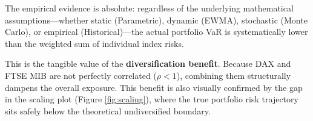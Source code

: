 \documentclass{report}
\begin{document}
The empirical evidence is absolute: regardless of the underlying mathematical assumptions—whether static (Parametric), dynamic (EWMA), stochastic (Monte Carlo), or empirical (Historical)—the actual portfolio VaR is systematically lower than the weighted sum of individual index risks. 

This is the tangible value of the \textbf{diversification benefit}. Because DAX and FTSE MIB are not perfectly correlated ($\rho < 1$), combining them structurally dampens the overall exposure. This benefit is also visually confirmed by the gap in the scaling plot (Figure \ref{fig:scaling}), where the true portfolio risk trajectory sits safely below the theoretical undiversified boundary.
\end{document}
